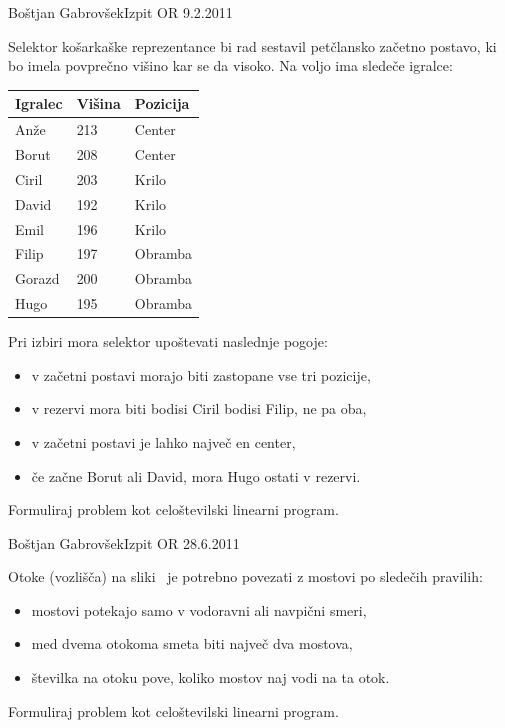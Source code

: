 \begin{naloga}{Boštjan Gabrovšek}{Izpit OR 9.2.2011}
\begin{vprasanje}[kosarka]
Selektor košarkaške reprezentance bi rad sestavil petčlansko začetno postavo, ki bo imela povprečno
višino kar se da visoko. Na voljo ima sledeče igralce:
\begin{center}
\begin{tabular}{lll}
Igralec & Višina & Pozicija \\ \hline
Anže    & 213    & Center   \\
Borut   & 208    & Center   \\
Ciril   & 203    & Krilo    \\
David   & 192    & Krilo    \\
Emil    & 196    & Krilo    \\
Filip   & 197    & Obramba  \\
Gorazd  & 200    & Obramba  \\
Hugo    & 195    & Obramba  \\
\end{tabular}
\end{center}
Pri izbiri mora selektor upoštevati naslednje pogoje:
\begin{itemize}
\item v začetni postavi morajo biti zastopane vse tri pozicije,
\item v rezervi mora biti bodisi Ciril bodisi Filip, ne pa oba,
\item v začetni postavi je lahko največ en center,
\item če začne Borut ali David, mora Hugo ostati v rezervi.
\end{itemize}
Formuliraj problem kot celoštevilski linearni program.
\end{vprasanje}
\begin{odgovor}
\end{odgovor}
\end{naloga}


\begin{naloga}{Boštjan Gabrovšek}{Izpit OR 28.6.2011}
\begin{vprasanje}[mostovi]
Otoke (vozlišča) na sliki~\fig{}
je potrebno povezati z mostovi po sledečih pravilih:
\begin{itemize}
\item mostovi potekajo samo v vodoravni ali navpični smeri,
\item med dvema otokoma smeta biti največ dva mostova,
\item številka na otoku pove, koliko mostov naj vodi na ta otok.
\end{itemize}
Formuliraj problem kot celoštevilski linearni program.

\begin{slika}
\pgfslika
{}
\end{slika}
\end{vprasanje}
\begin{odgovor}
\end{odgovor}
\end{naloga}


